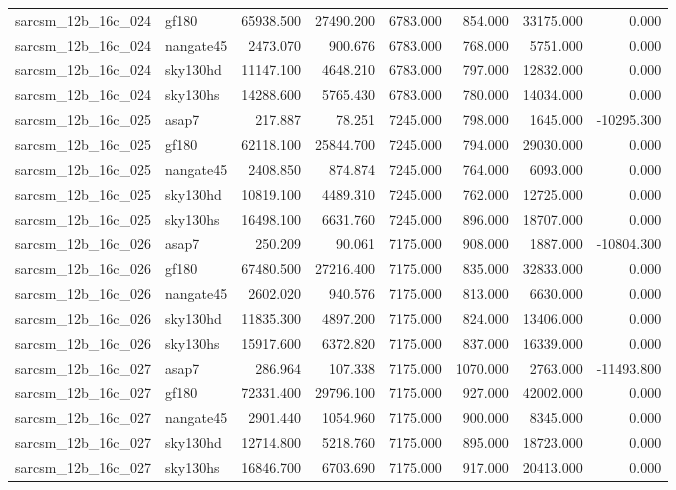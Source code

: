 \begin{tabular}{llrrrrrr}
sarcsm\_12b\_16c\_024 & gf180 & 65938.500 & 27490.200 & 6783.000 & 854.000 & 33175.000 & 0.000 \\
sarcsm\_12b\_16c\_024 & nangate45 & 2473.070 & 900.676 & 6783.000 & 768.000 & 5751.000 & 0.000 \\
sarcsm\_12b\_16c\_024 & sky130hd & 11147.100 & 4648.210 & 6783.000 & 797.000 & 12832.000 & 0.000 \\
sarcsm\_12b\_16c\_024 & sky130hs & 14288.600 & 5765.430 & 6783.000 & 780.000 & 14034.000 & 0.000 \\
sarcsm\_12b\_16c\_025 & asap7 & 217.887 & 78.251 & 7245.000 & 798.000 & 1645.000 & -10295.300 \\
sarcsm\_12b\_16c\_025 & gf180 & 62118.100 & 25844.700 & 7245.000 & 794.000 & 29030.000 & 0.000 \\
sarcsm\_12b\_16c\_025 & nangate45 & 2408.850 & 874.874 & 7245.000 & 764.000 & 6093.000 & 0.000 \\
sarcsm\_12b\_16c\_025 & sky130hd & 10819.100 & 4489.310 & 7245.000 & 762.000 & 12725.000 & 0.000 \\
sarcsm\_12b\_16c\_025 & sky130hs & 16498.100 & 6631.760 & 7245.000 & 896.000 & 18707.000 & 0.000 \\
sarcsm\_12b\_16c\_026 & asap7 & 250.209 & 90.061 & 7175.000 & 908.000 & 1887.000 & -10804.300 \\
sarcsm\_12b\_16c\_026 & gf180 & 67480.500 & 27216.400 & 7175.000 & 835.000 & 32833.000 & 0.000 \\
sarcsm\_12b\_16c\_026 & nangate45 & 2602.020 & 940.576 & 7175.000 & 813.000 & 6630.000 & 0.000 \\
sarcsm\_12b\_16c\_026 & sky130hd & 11835.300 & 4897.200 & 7175.000 & 824.000 & 13406.000 & 0.000 \\
sarcsm\_12b\_16c\_026 & sky130hs & 15917.600 & 6372.820 & 7175.000 & 837.000 & 16339.000 & 0.000 \\
sarcsm\_12b\_16c\_027 & asap7 & 286.964 & 107.338 & 7175.000 & 1070.000 & 2763.000 & -11493.800 \\
sarcsm\_12b\_16c\_027 & gf180 & 72331.400 & 29796.100 & 7175.000 & 927.000 & 42002.000 & 0.000 \\
sarcsm\_12b\_16c\_027 & nangate45 & 2901.440 & 1054.960 & 7175.000 & 900.000 & 8345.000 & 0.000 \\
sarcsm\_12b\_16c\_027 & sky130hd & 12714.800 & 5218.760 & 7175.000 & 895.000 & 18723.000 & 0.000 \\
sarcsm\_12b\_16c\_027 & sky130hs & 16846.700 & 6703.690 & 7175.000 & 917.000 & 20413.000 & 0.000 \\

\end{tabular}
